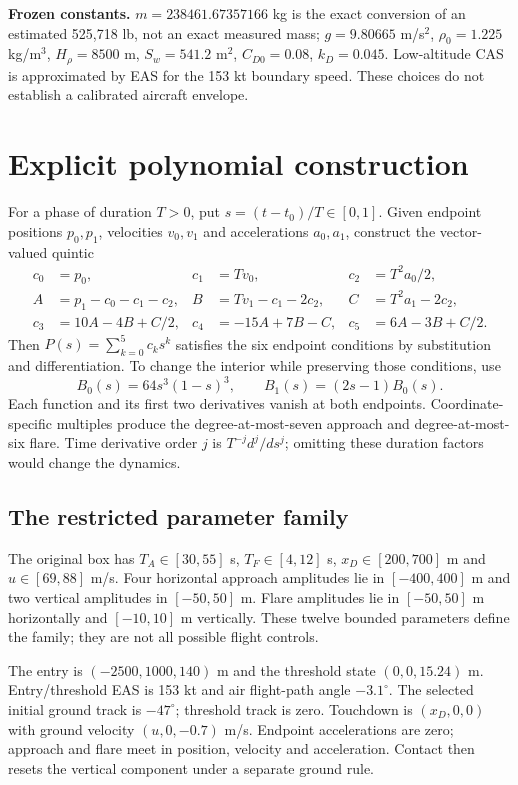 \textbf{Frozen constants.} $m=238461.67357166$ kg is the exact conversion of an estimated 525,718 lb, not an exact measured mass; $g=9.80665$ m/s$^2$, $\rho_0=1.225$ kg/m$^3$, $H_\rho=8500$ m, $S_w=541.2$ m$^2$, $C_{D0}=0.08$, $k_D=0.045$. Low-altitude CAS is approximated by EAS for the 153 kt boundary speed. These choices do not establish a calibrated aircraft envelope.
\par\medskip
\section{Explicit polynomial construction}\label{app:polynomial}
For a phase of duration $T>0$, put $s=(t-t_0)/T\in[0,1]$. Given endpoint positions $p_0,p_1$, velocities $v_0,v_1$ and accelerations $a_0,a_1$, construct the vector-valued quintic
\begin{align}
c_0&=p_0,&c_1&=Tv_0,&c_2&=T^2a_0/2,\\
A&=p_1-c_0-c_1-c_2,&B&=Tv_1-c_1-2c_2,&C&=T^2a_1-2c_2,\\
c_3&=10A-4B+C/2,&c_4&=-15A+7B-C,&c_5&=6A-3B+C/2.
\end{align}
Then $P(s)=\sum_{k=0}^{5}c_ks^k$ satisfies the six endpoint conditions by substitution and differentiation. To change the interior while preserving those conditions, use
\[
B_0(s)=64s^3(1-s)^3,\qquad B_1(s)=(2s-1)B_0(s).
\]
Each function and its first two derivatives vanish at both endpoints. Coordinate-specific multiples produce the degree-at-most-seven approach and degree-at-most-six flare. Time derivative order $j$ is $T^{-j}d^j/ds^j$; omitting these duration factors would change the dynamics.

\subsection*{The restricted parameter family}
The original box has $T_A\in[30,55]$ s, $T_F\in[4,12]$ s, $x_D\in[200,700]$ m and $u\in[69,88]$ m/s. Four horizontal approach amplitudes lie in $[-400,400]$ m and two vertical amplitudes in $[-50,50]$ m. Flare amplitudes lie in $[-50,50]$ m horizontally and $[-10,10]$ m vertically. These twelve bounded parameters define the family; they are not all possible flight controls.

The entry is $(-2500,1000,140)$ m and the threshold state $(0,0,15.24)$ m. Entry/threshold EAS is 153 kt and air flight-path angle $-3.1^\circ$. The selected initial ground track is $-47^\circ$; threshold track is zero. Touchdown is $(x_D,0,0)$ with ground velocity $(u,0,-0.7)$ m/s. Endpoint accelerations are zero; approach and flare meet in position, velocity and acceleration. Contact then resets the vertical component under a separate ground rule.

